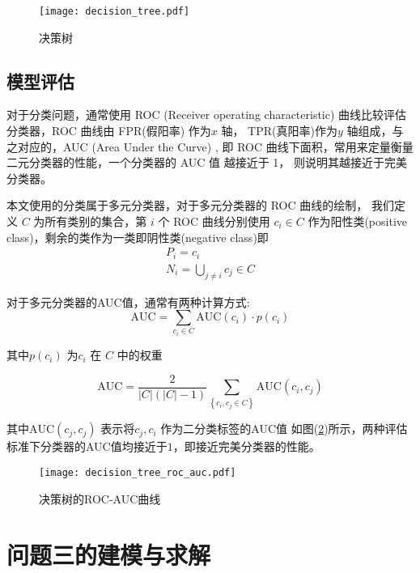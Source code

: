 \begin{figure}[!h]
	\centering
	\texttt{[image: decision\_tree.pdf]}
	\caption{决策树}
	\label{fig:decision_tree}
\end{figure}





\subsection{模型评估}
对于分类问题，通常使用 ROC (Receiver operating characteristic) \cite{fawcett2006introduction}
曲线比较评估分类器，ROC 曲线由 FPR(假阳率) 作为$x$ 轴，
TPR(真阳率)作为$y$ 轴组成，与之对应的，AUC (Area Under the Curve) \cite{fawcett2006introduction},
即 ROC 曲线下面积，常用来定量衡量二元分类器的性能，一个分类器的 AUC 值
越接近于 1， 则说明其越接近于完美分类器。

本文使用的分类属于多元分类器，对于多元分类器的 ROC 曲线的绘制，
我们定义 $C$ 为所有类别的集合，第 $i$ 个 ROC 曲线分别使用 $c_i \in C$
作为阳性类(positive class)，剩余的类作为一类即阴性类(negative class)即
\begin{gather}
	P_i = c_i  \\
	N_i = \bigcup_{j \neq i} c_j \in C
\end{gather}

对于多元分类器的AUC值，通常有两种计算方式:
\begin{equation}
	\text{AUC} = \sum_{c_i \in C} \text{AUC}(c_i) \cdot p(c_i)
\end{equation}

其中$p(c_i)$ 为$c_i$ 在 $C$ 中的权重

\begin{equation}
	\text{AUC} = \dfrac{2}{\left | C \right |\left ( \left | C \right |-1  \right )}\sum_{\left \{ c_{i},c_{j}\in C \right \} }\text{AUC}\left ( c_{i},c_{j} \right )
\end{equation}

其中$\text{AUC}(c_j, c_j)$ 表示将$c_j, c_i$ 作为二分类标签的AUC值
如图(\ref{fig:decision_tree_roc_auc})所示，两种评估标准下分类器的AUC值均接近于$1$，即接近完美分类器的性能。

\begin{figure}[!h]
	\centering
	\texttt{[image: decision\_tree\_roc\_auc.pdf]}
	\caption{决策树的ROC-AUC曲线}
	\label{fig:decision_tree_roc_auc}
\end{figure}




\section{问题三的建模与求解}


